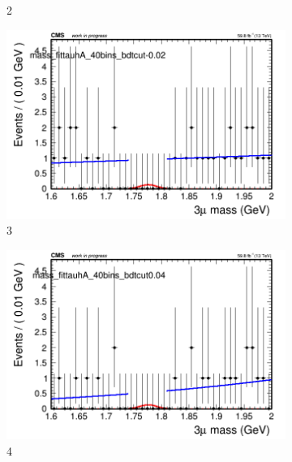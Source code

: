 \begin{figure}[h!]
\begin{subfigure}{0.2\textwidth}
        \caption{2}
    \end{subfigure}
    \begin{subfigure}{0.2\textwidth}
        \includegraphics[width=\textwidth]{power_law/plots/tauhA/massfit_tauhA_40bins_bdtcut-0.02.png}
        \caption{3}
    \end{subfigure}
    \begin{subfigure}{0.2\textwidth}
        \includegraphics[width=\textwidth]{power_law/plots/tauhA/massfit_tauhA_40bins_bdtcut0.04.png}
        \caption{4}
    \end{subfigure}
    \begin{subfigure}{0.2\textwidth}

\end{subfigure}
\end{figure}
